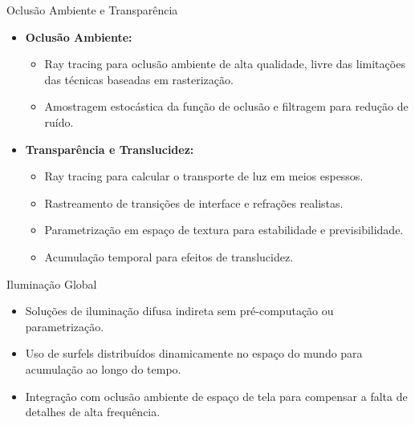 \documentclass[aspectratio=169,xcolor=table]{beamer}
\begin{document}
\begin{frame}{Oclusão Ambiente e Transparência}
    \begin{itemize}
        \item \textbf{Oclusão Ambiente:}
        \begin{itemize}
            \item Ray tracing para oclusão ambiente de alta qualidade, livre das limitações das técnicas baseadas em rasterização.
            \item Amostragem estocástica da função de oclusão e filtragem para redução de ruído.
        \end{itemize}
        \item \textbf{Transparência e Translucidez:}
        \begin{itemize}
            \item Ray tracing para calcular o transporte de luz em meios espessos.
            \item Rastreamento de transições de interface e refrações realistas.
            \item Parametrização em espaço de textura para estabilidade e previsibilidade.
            \item Acumulação temporal para efeitos de translucidez.
        \end{itemize}
    \end{itemize}
\end{frame}

\begin{frame}{Iluminação Global}
    \begin{itemize}
        \item Soluções de iluminação difusa indireta sem pré-computação ou parametrização.
        \item Uso de surfels distribuídos dinamicamente no espaço do mundo para acumulação ao longo do tempo.
        \item Integração com oclusão ambiente de espaço de tela para compensar a falta de detalhes de alta frequência.
    \end{itemize}
\end{frame}

\end{document}
